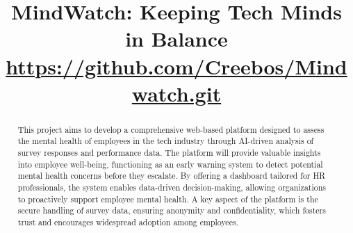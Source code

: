 \documentclass[conference]{IEEEtran}
\begin{document}
\title{MindWatch: Keeping Tech Minds in Balance\\
{\footnotesize \textsuperscript{}\href{https://github.com/Creebos/Mindwatch.git}{https://github.com/Creebos/Mindwatch.git}}
}

\author{
\and
{}
\and
{}
\and
{}
}

\maketitle

\begin{abstract}
    This project aims to develop a comprehensive web-based
    platform designed to assess the mental health of employees in
    the tech industry through AI-driven analysis of survey
    responses and performance data. The platform will provide
    valuable insights into employee well-being, functioning as an
    early warning system to detect potential mental health concerns
    before they escalate. By offering a dashboard tailored for HR
    professionals, the system enables data-driven decision-making,
    allowing organizations to proactively support employee mental
    health. A key aspect of the platform is the secure handling of
    survey data, ensuring anonymity and confidentiality, which
    fosters trust and encourages widespread adoption among
    employees.
\end{abstract}
\end{document}
